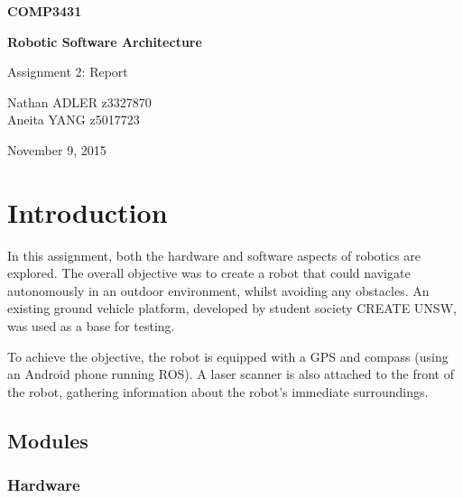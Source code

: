 \documentclass[titlepage,12pt,a4paper]{article}
\begin{document}
\begin{titlepage}
    \begin{center}
        \vspace*{3cm}
        
        \Huge
        \textbf{COMP3431\\}
        \title{}
        \vspace{0.5cm}
        \Huge
        \textbf{Robotic Software Architecture}
        
        \vspace{0.54cm}
        
        \Large
        Assignment 2: Report
        
        \vspace{5cm}

	\large
	Nathan ADLER \hspace*{10pt} z3327870\\
	Aneita YANG \hspace*{24pt} z5017723\\

	\vfill
        
        \Large
        November 9, 2015
        
    \end{center}
\end{titlepage}

\pagebreak
\tableofcontents

\pagebreak
\section{Introduction}
In this assignment, both the hardware and software aspects of robotics are explored. The overall objective was to create a robot that could navigate autonomously in an outdoor environment, whilst avoiding any obstacles. An existing ground vehicle platform, developed by student society CREATE UNSW, was used as a base for testing.

To achieve the objective, the robot is equipped with a GPS and compass (using an Android phone running ROS). A laser scanner is also attached to the front of the robot, gathering information about the robot's immediate surroundings.

\subsection{Modules}

\subsubsection{Hardware}
\end{document}
